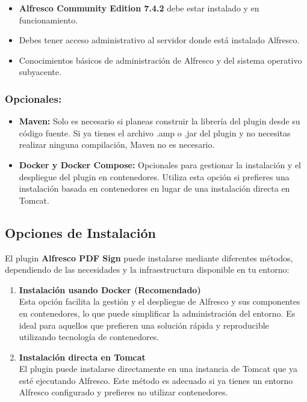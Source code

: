\documentclass{ol-softwaremanual}
\begin{document}
\begin{itemize}
	\item \textbf{Alfresco Community Edition 7.4.2} debe estar instalado y en funcionamiento.
	\item Debes tener acceso administrativo al servidor donde está instalado Alfresco.
	\item Conocimientos básicos de administración de Alfresco y del sistema operativo subyacente.
\end{itemize}

\subsubsection{Opcionales:}
\begin{itemize}
	\item \textbf{Maven:} Solo es necesario si planeas construir la librería del plugin desde su código fuente. Si ya tienes el archivo .amp o .jar del plugin y no necesitas realizar ninguna compilación, Maven no es necesario.
	\item \textbf{Docker y Docker Compose:} Opcionales para gestionar la instalación y el despliegue del plugin en contenedores. Utiliza esta opción si prefieres una instalación basada en contenedores en lugar de una instalación directa en Tomcat.
\end{itemize}

\subsection{Opciones de Instalación}
El plugin \textbf{Alfresco PDF Sign} puede instalarse mediante diferentes métodos, dependiendo de las necesidades y la infraestructura disponible en tu entorno:

\begin{enumerate}
	\item \textbf{Instalación usando Docker (Recomendado)} \\
	Esta opción facilita la gestión y el despliegue de Alfresco y sus componentes en contenedores, lo que puede simplificar la administración del entorno. Es ideal para aquellos que prefieren una solución rápida y reproducible utilizando tecnología de contenedores.
	
	\item \textbf{Instalación directa en Tomcat} \\
	El plugin puede instalarse directamente en una instancia de Tomcat que ya esté ejecutando Alfresco. Este método es adecuado si ya tienes un entorno Alfresco configurado y prefieres no utilizar contenedores.
\end{enumerate}
\end{document}
